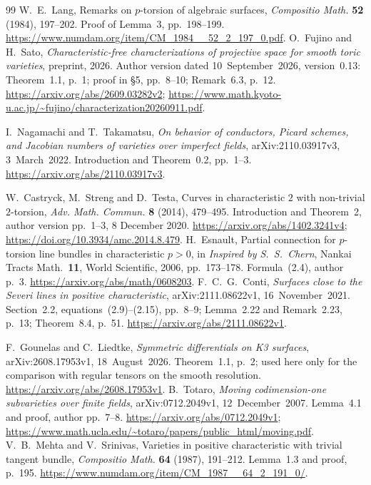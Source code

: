 \documentclass[11pt]{article}
\theoremstyle{remark}\newtheorem{remark}[theorem]{Remark}
\begin{document}
\begin{thebibliography}{99}
W.~E.~Lang, Remarks on $p$-torsion of algebraic surfaces,
\emph{Compositio Math.} \textbf{52} (1984), 197--202.
Proof of Lemma~3, pp.~198--199.
\url{https://www.numdam.org/item/CM_1984__52_2_197_0.pdf}.
O.~Fujino and H.~Sato, \emph{Characteristic-free characterizations
of projective space for smooth toric varieties}, preprint, 2026.
Author version dated 10~September~2026, version~0.13:
Theorem~1.1, p.~1; proof in \S5, pp.~8--10; Remark~6.3, p.~12.
\url{https://arxiv.org/abs/2609.03282v2};
\url{https://www.math.kyoto-u.ac.jp/~fujino/characterization20260911.pdf}.


I.~Nagamachi and T.~Takamatsu, \emph{On behavior of conductors,
Picard schemes, and Jacobian numbers of varieties over imperfect fields},
arXiv:2110.03917v3, 3~March~2022.
Introduction and Theorem~0.2, pp.~1--3.
\url{https://arxiv.org/abs/2110.03917v3}.


W.~Castryck, M.~Streng and D.~Testa,
Curves in characteristic $2$ with non-trivial $2$-torsion,
\emph{Adv. Math. Commun.} \textbf{8} (2014), 479--495.
Introduction and Theorem~2, author version pp.~1--3,
8 December 2020.
\url{https://arxiv.org/abs/1402.3241v4};
\url{https://doi.org/10.3934/amc.2014.8.479}.
H.~Esnault, Partial connection for $p$-torsion line bundles in
characteristic $p>0$, in \emph{Inspired by S.~S.~Chern},
Nankai Tracts Math.~\textbf{11}, World Scientific, 2006, pp.~173--178.
Formula~(2.4), author p.~3.
\url{https://arxiv.org/abs/math/0608203}.
F.~C.~G.~Conti,
\emph{Surfaces close to the Severi lines in positive characteristic},
arXiv:2111.08622v1, 16~November~2021.
Section~2.2, equations~(2.9)--(2.15), pp.~8--9;
Lemma~2.22 and Remark~2.23, p.~13;
Theorem~8.4, p.~51.
\url{https://arxiv.org/abs/2111.08622v1}.

F.~Gounelas and C.~Liedtke, \emph{Symmetric differentials on K3
surfaces}, arXiv:2608.17953v1, 18~August~2026.
Theorem~1.1, p.~2; used here only for the comparison with
regular tensors on the smooth resolution.
\url{https://arxiv.org/abs/2608.17953v1}.
B.~Totaro, \emph{Moving codimension-one subvarieties over finite fields},
arXiv:0712.2049v1, 12~December~2007.
Lemma~4.1 and proof, author pp.~7--8.
\url{https://arxiv.org/abs/0712.2049v1};
\url{https://www.math.ucla.edu/~totaro/papers/public_html/moving.pdf}.
V.~B.~Mehta and V.~Srinivas,
Varieties in positive characteristic with trivial tangent bundle,
\emph{Compositio Math.} \textbf{64} (1987), 191--212.
Lemma~1.3 and proof, p.~195.
\url{https://www.numdam.org/item/CM_1987__64_2_191_0/}.
\end{thebibliography}
\end{document}
